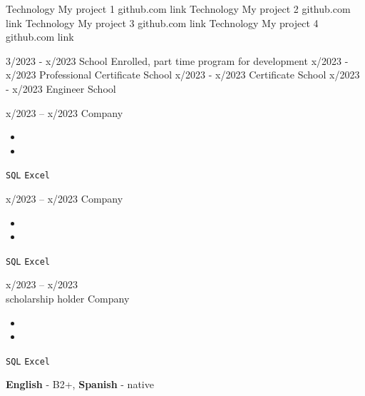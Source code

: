 \documentclass[9pt]{developercv} %
\begin{document}
    \begin{entrylist}
        \entry
        {Technology}
        {My project 1}
        {github.com link}
        {%
            \lipsum[1][1-3]}
        \entry
        {Technology}
        {My project 2}
        {github.com link}
        {%
            \lipsum[1][1-3]}
      \entry
        {Technology}
        {My project 3}
        {github.com link}
        {%
            \lipsum[1][1-3]}
        \entry
        {Technology}
        {My project 4}
        {github.com link}
        {%
            \lipsum[1][1-3]}
    \end{entrylist}
    
    \vspace{-10 pt}
\begin{entrylist}
    \entry
		{3/2023 - x/2023}
		{\lipsum[1][1] }
		{School}
		{Enrolled, part time program for development}
    \entry
		{x/2023 - x/2023}
		{Professional Certificate}
		{School}
		{\lipsum[1][1]}
	\entry
		{x/2023 - x/2023}
		{Certificate}
		{School}
		{\lipsum[1][2]}
	\entry
		{x/2023 - x/2023}
		{Engineer}
		{School}
		{\lipsum[1][2]}
\end{entrylist}
    
    \vspace{-10 pt}
    \begin{entrylist}
      \entry
            {x/2023 -- x/2023}
        {\lipsum[1][1]}
        {Company}
        {\vspace{-10pt}
            \begin{itemize}[noitemsep,topsep=0pt,parsep=0pt,partopsep=0pt, leftmargin=-1pt]
                \item \lipsum[1][1-2]
                \item \lipsum[1][3-4]
            \end{itemize} 
            \texttt{SQL} \slashsep \texttt{Excel}}
      \entry
        {x/2023 -- x/2023}
        {\lipsum[1][1]}
        {Company}
        {\vspace{-10pt}
            \begin{itemize}[noitemsep,topsep=0pt,parsep=0pt,partopsep=0pt, leftmargin=-1pt]
                \item \lipsum[1][1-2]
                \item \lipsum[1][3-4]
            \end{itemize} 
            \texttt{SQL} \slashsep \texttt{Excel}}
      \entry
        {x/2023 -- x/2023 \\\footnotesize{scholarship holder}}
        {\lipsum[1][1]}
        {Company}
        {\vspace{-10pt}
            \begin{itemize}[noitemsep,topsep=0pt,parsep=0pt,partopsep=0pt, leftmargin=-1pt]
                \item \lipsum[1][1-2]
                \item \lipsum[1][3-4]
            \end{itemize} 
            \texttt{SQL} \slashsep \texttt{Excel}}
    \end{entrylist}
    
    \vspace{-10 pt}
    \vspace{-6pt}
    
    \hspace{26mm} \textbf{English} - B2+, \textbf{ Spanish} - native
    
\end{document}
